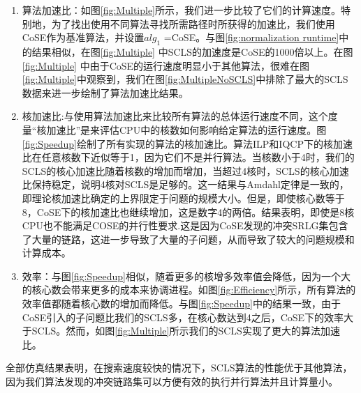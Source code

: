 \begin{enumerate}
   \item   算法加速比：如图\ref{fig:Multiple}所示，我们进一步比较了它们的计算速度。特别地，为了找出使用不同算法寻找所需路径时所获得的加速比，我们使用CoSE作为基准算法，并设置$alg_1$ =CoSE。与图\ref{fig:normalization runtime}中的结果相似，在图\ref{fig:Multiple} 中SCLS的加速度是CoSE的1000倍以上。在图\ref{fig:Multiple} 中由于CoSE的运行速度明显小于其他算法，很难在图\ref{fig:Multiple}中观察到，我们在图\ref{fig:MultipleNoSCLS}中排除了最大的SCLS数据来进一步绘制了算法加速比结果。
   \item 核加速比:与使用算法加速比来比较所有算法的总体运行速度不同，这个度量“核加速比”是来评估CPU中的核数如何影响给定算法的运行速度。图\ref{fig:Speedup}绘制了所有实现的算法的核加速比。算法ILP和IQCP下的核加速比在任意核数下近似等于1，因为它们不是并行算法。当核数小于4时，我们的SCLS的核心加速比随着核数的增加而增加，当超过4核时，SCLS的核心加速比保持稳定，说明4核对SCLS是足够的。这一结果与Amdahl定律\cite{amdahl1967validity}是一致的，即理论核加速比确定的上界限定于问题的规模大小。但是，即使核心数等于8，CoSE下的核加速比也继续增加，这是数字4的两倍。结果表明，即使是8核CPU也不能满足COSE的并行性要求.这是因为CoSE发现的冲突SRLG集包含了大量的链路，这进一步导致了大量的子问题，从而导致了较大的问题规模和计算成本。
    \item 效率：与图\ref{fig:Speedup}相似，随着更多的核增多效率值会降低，因为一个大的核心数会带来更多的成本来协调进程。如图\ref{fig:Efficiency}所示，所有算法的效率值都随着核心数的增加而降低。与图\ref{fig:Speedup}中的结果一致，由于CoSE引入的子问题比我们的SCLS多，在核心数达到4之后，CoSE下的效率大于SCLS。然而，如图\ref{fig:Multiple}所示我们的SCLS实现了更大的算法加速比。
\end{enumerate}

全部仿真结果表明，在搜索速度较快的情况下，SCLS算法的性能优于其他算法，因为我们算法发现的冲突链路集可以方便有效的执行并行算法并且计算量小。


